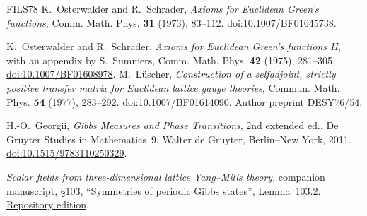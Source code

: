\documentclass[11pt,letterpaper,reqno]{amsart}
\theoremstyle{definition}
\theoremstyle{remark}
\begin{document}
\begin{thebibliography}{FILS78}
K.~Osterwalder and R.~Schrader,
\emph{Axioms for Euclidean Green's functions},
Comm. Math. Phys. \textbf{31} (1973), 83--112.
\href{https://doi.org/10.1007/BF01645738}{doi:10.1007/BF01645738}.

K.~Osterwalder and R.~Schrader,
\emph{Axioms for Euclidean Green's functions II},
with an appendix by S.~Summers,
Comm. Math. Phys. \textbf{42} (1975), 281--305.
\href{https://doi.org/10.1007/BF01608978}{doi:10.1007/BF01608978}.
M.~L\"uscher, \emph{Construction of a selfadjoint, strictly positive
transfer matrix for Euclidean lattice gauge theories}, Commun. Math.
Phys. \textbf{54} (1977), 283--292.
\href{https://doi.org/10.1007/BF01614090}{doi:10.1007/BF01614090}.
Author preprint DESY76/54.

H.-O.~Georgii,
\emph{Gibbs Measures and Phase Transitions}, 2nd extended ed.,
De Gruyter Studies in Mathematics~9, Walter de Gruyter,
Berlin--New York, 2011.
\href{https://doi.org/10.1515/9783110250329}{doi:10.1515/9783110250329}.

\emph{Scalar fields from three-dimensional lattice Yang--Mills theory},
companion manuscript, \S103, ``Symmetries of periodic Gibbs states'',
Lemma~103.2.
\href{https://github.com/ethanwsussman/Yang--Mills-LLM-experiment/blob/1b92bd0347e3b8763cd8ecc1f96dc3c2a92dd310/YM3/YMM1.pdf}{Repository edition}.

\end{thebibliography}
\end{document}
